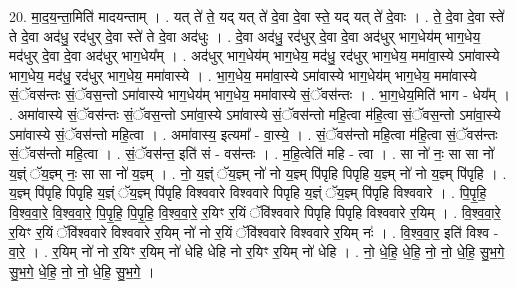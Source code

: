 \documentclass[17pt]{extarticle}
\begin{document}
20. मा॒द॒य॒न्ता॒मिति॑ मादयन्ताम् । . यत् ते॑ ते॒ यद् यत् ते॑ दे॒वा दे॒वा स्ते॒ यद् यत् ते॑ दे॒वाः । . ते॒ दे॒वा दे॒वा स्ते॑ ते दे॒वा अद॑धु॒ रद॑धुर् दे॒वा स्ते॑ ते दे॒वा अद॑धुः । . दे॒वा अद॑धु॒ रद॑धुर् दे॒वा दे॒वा अद॑धुर् भाग॒धेय॑म् भाग॒धेय॒ मद॑धुर् दे॒वा दे॒वा अद॑धुर् भाग॒धेय᳚म् । . अद॑धुर् भाग॒धेय॑म् भाग॒धेय॒ मद॑धु॒ रद॑धुर् भाग॒धेय॒ ममा॑वा॒स्ये ऽमा॑वास्ये भाग॒धेय॒ मद॑धु॒ रद॑धुर् भाग॒धेय॒ ममा॑वास्ये । . भा॒ग॒धेय॒ ममा॑वा॒स्ये ऽमा॑वास्ये भाग॒धेय॑म् भाग॒धेय॒ ममा॑वास्ये सं॒ॅवस॑न्तः सं॒ॅवस॒न्तो ऽमा॑वास्ये भाग॒धेय॑म् भाग॒धेय॒ ममा॑वास्ये सं॒ॅवस॑न्तः । . भा॒ग॒धेय॒मिति॑ भाग - धेय᳚म् । . अमा॑वास्ये सं॒ॅवस॑न्तः सं॒ॅवस॒न्तो ऽमा॑वा॒स्ये ऽमा॑वास्ये सं॒ॅवस॑न्तो महि॒त्वा म॑हि॒त्वा सं॒ॅवस॒न्तो ऽमा॑वा॒स्ये ऽमा॑वास्ये सं॒ॅवस॑न्तो महि॒त्वा । . अमा॑वास्य॒ इत्यमा᳚ - वा॒स्ये॒ । . सं॒ॅवस॑न्तो महि॒त्वा म॑हि॒त्वा सं॒ॅवस॑न्तः सं॒ॅवस॑न्तो महि॒त्वा । . सं॒ॅवस॑न्त॒ इति॑ सं - वस॑न्तः । . म॒हि॒त्वेति॑ महि - त्वा । . सा नो॑ नः॒ सा सा नो॑ य॒ज्ञ्ं ॅय॒ज्ञ्म् नः॒ सा सा नो॑ य॒ज्ञ्म् । . नो॒ य॒ज्ञ्ं ॅय॒ज्ञ्म् नो॑ नो य॒ज्ञ्म् पि॑पृहि पिपृहि य॒ज्ञ्म् नो॑ नो य॒ज्ञ्म् पि॑पृहि । . य॒ज्ञ्म् पि॑पृहि पिपृहि य॒ज्ञ्ं ॅय॒ज्ञ्म् पि॑पृहि विश्ववारे विश्ववारे पिपृहि य॒ज्ञ्ं ॅय॒ज्ञ्म् पि॑पृहि विश्ववारे । . पि॒पृ॒हि॒ वि॒श्व॒वा॒रे॒ वि॒श्व॒वा॒रे॒ पि॒पृ॒हि॒ पि॒पृ॒हि॒ वि॒श्व॒वा॒रे॒ र॒यिꣳ र॒यिं ॅवि॑श्ववारे पिपृहि पिपृहि विश्ववारे र॒यिम् । . वि॒श्व॒वा॒रे॒ र॒यिꣳ र॒यिं ॅवि॑श्ववारे विश्ववारे र॒यिम् नो॑ नो र॒यिं ॅवि॑श्ववारे विश्ववारे र॒यिम् नः॑ । . वि॒श्व॒वा॒र॒ इति॑ विश्व - वा॒रे॒ । . र॒यिम् नो॑ नो र॒यिꣳ र॒यिम् नो॑ धेहि धेहि नो र॒यिꣳ र॒यिम् नो॑ धेहि । . नो॒ धे॒हि॒ धे॒हि॒ नो॒ नो॒ धे॒हि॒ सु॒भ॒गे॒ सु॒भ॒गे॒ धे॒हि॒ नो॒ नो॒ धे॒हि॒ सु॒भ॒गे॒ । \newline
\end{document}
